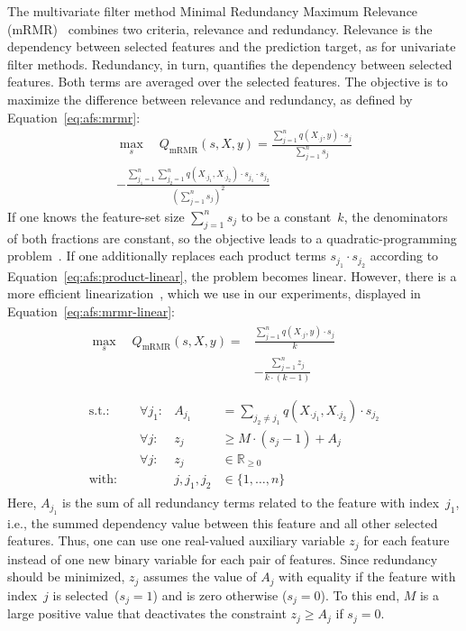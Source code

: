 \documentclass[iicol, sn-basic, Numbered]{sn-jnl} %
\theoremstyle{plain}
\theoremstyle{definition}
\begin{document}
The multivariate filter method Minimal Redundancy Maximum Relevance (mRMR)~\cite{peng2005feature} combines two criteria, relevance and redundancy.
Relevance is the dependency between selected features and the prediction target, as for univariate filter methods. 
Redundancy, in turn, quantifies the dependency between selected features.
Both terms are averaged over the selected features.
The objective is to maximize the difference between relevance and redundancy, as defined by Equation~\ref{eq:afs:mrmr}:
%
\begin{multline}
	\max_s \quad Q_{\text{mRMR}}(s,X,y) = \frac{\sum_{j=1}^{n} q(X_{\cdot{}j},y) \cdot s_j}{\sum_{j=1}^{n} s_j} \\
	- \frac{\sum_{j_1=1}^{n} \sum_{j_2=1}^{n} q(X_{\cdot{}j_1}, X_{\cdot{}j_2}) \cdot s_{j_1} \cdot s_{j_2}}{(\sum_{j=1}^{n} s_j)^2}
	\label{eq:afs:mrmr}
\end{multline}
%
If one knows the feature-set size $\sum_{j=1}^{n} s_j$ to be a constant~$k$, the denominators of both fractions are constant, so the objective leads to a quadratic-programming problem~\cite{nguyen2014effective, rodriguez2010quadratic}.
If one additionally replaces each product terms $s_{j_1} \cdot s_{j_2}$ according to Equation~\ref{eq:afs:product-linear}, the problem becomes linear.
However, there is a more efficient linearization~\cite{nguyen2009optimizing, nguyen2010towards}, which we use in our experiments, displayed in Equation~\ref{eq:afs:mrmr-linear}:
%
\begin{equation}
	\begin{gathered}
		\begin{aligned}
			\max_s \quad Q_{\text{mRMR}}(s,X,y) = & \frac{\sum_{j=1}^{n} q(X_{\cdot{}j},y) \cdot s_j}{k} \\
			& - \frac{\sum_{j=1}^{n} z_j}{k \cdot (k-1)} \\
		\end{aligned} \\
		\begin{aligned}
			\text{s.t.:} &\quad \forall j_1: & A_{j_1} &= \sum_{j_2 \neq j_1} q(X_{\cdot{}j_1}, X_{\cdot{}j_2}) \cdot s_{j_2} \\
			&\quad \forall j: & z_j &\geq M \cdot (s_j - 1) + A_j \\
			&\quad \forall j: & z_j &\in \mathbb{R}_{\geq 0} \\
			\text{with:} &\quad & j, j_1, j_2 &\in \{1, \dots, n\}
		\end{aligned}
	\end{gathered}
	\label{eq:afs:mrmr-linear}
\end{equation}
%
Here, $A_{j_1}$ is the sum of all redundancy terms related to the feature with index~$j_1$, i.e., the summed dependency value between this feature and all other selected features.
Thus, one can use one real-valued auxiliary variable $z_j$ for each feature instead of one new binary variable for each pair of features.
Since redundancy should be minimized, $z_j$ assumes the value of $A_j$ with equality if the feature with index~$j$ is selected~($s_j=1$) and is zero otherwise ($s_j=0$).
To this end, $M$ is a large positive value that deactivates the constraint $z_j \geq A_j$ if $s_j=0$.
\end{document}
